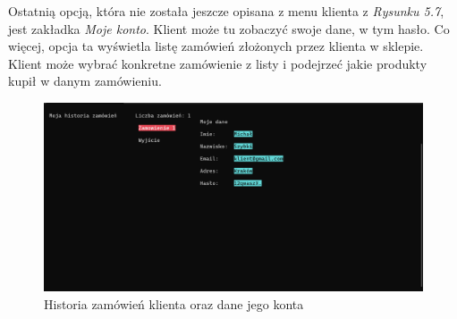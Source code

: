 Ostatnią opcją, która nie została jeszcze opisana z menu klienta z \textit{Rysunku 5.7}, jest zakładka \textit{Moje konto}. Klient może tu zobaczyć swoje dane, w tym hasło. Co więcej, opcja ta wyświetla listę zamówień złożonych przez klienta w sklepie. Klient może wybrać konkretne zamówienie z listy i podejrzeć jakie produkty kupił w danym zamówieniu.

\begin{figure}[H]
	\centering
		\includegraphics[width=15cm]{screeny/historia_klienta.png}
	\caption{\footnotesize Historia zamówień klienta oraz dane jego konta}
	\label{fig:plotend}
\end{figure}